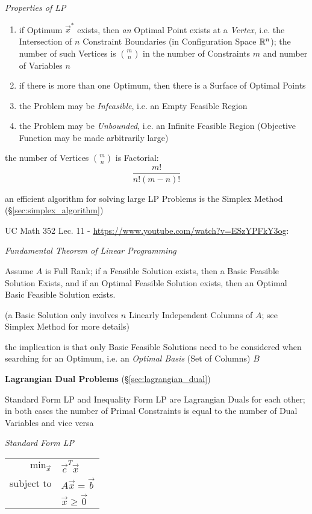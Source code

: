 \emph{Properties of LP}

\begin{enumerate}
  \item if Optimum $\vec{x}^*$ exists, then \emph{an} Optimal Point exists at a
    \emph{Vertex}, i.e. the Intersection of $n$ Constraint Boundaries (in
    Configuration Space $\mathbb{R}^n$); the number of such Vertices is
    $\binom{m}{n}$ in the number of Constraints $m$ and number of Variables $n$
  \item if there is more than one Optimum, then there is a Surface of Optimal
    Points
  \item the Problem may be \emph{Infeasible}, i.e. an Empty Feasible Region
  \item the Problem may be \emph{Unbounded}, i.e. an Infinite Feasible Region
    (Objective Function may be made arbitrarily large)
\end{enumerate}

the number of Vertices $\binom{m}{n}$ is Factorial:
\[
  \frac{m!}{n!(m-n)!}
\]

an efficient algorithm for solving large LP Problems is the Simplex Method
(\S\ref{sec:simplex_algorithm})


UC Math 352 Lec. 11 - \url{https://www.youtube.com/watch?v=ESzYPFkY3og}:


\emph{Fundamental Theorem of Linear Programming}

Assume $A$ is Full Rank; if a Feasible Solution exists, then a Basic Feasible
Solution Exists, and if an Optimal Feasible Solution exists, then an Optimal
Basic Feasible Solution exists.

(a Basic Solution only involves $n$ Linearly Independent Columns of $A$; see
Simplex Method for more details)

the implication is that only Basic Feasible Solutions need to be considered
when searching for an Optimum, i.e. an \emph{Optimal Basis} (Set of Columns)
$B$


\textbf{Lagrangian Dual Problems} (\S\ref{sec:lagrangian_dual})

Standard Form LP and Inequality Form LP are Lagrangian Duals for each other; in
both cases the number of Primal Constraints is equal to the number of Dual
Variables and vice versa

\emph{Standard Form LP}

\begin{tabular}{r l}
  $\mathrm{min}_{\vec{x}}$ & $\vec{c}^T\vec{x}$     \\
  subject to               & $A\vec{x} = \vec{b}$   \\
                           & $\vec{x} \geq \vec{0}$ \\
\end{tabular}

